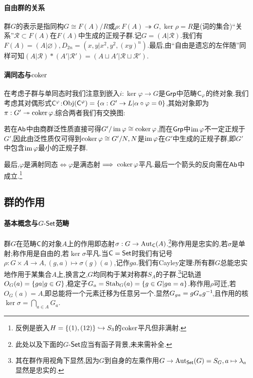 \documentclass[11pt]{article} %
\begin{document}
\paragraph{自由群的关系}
群$G$的表示是指同构$G\cong F(A)/R$或$\rho:F(A)\twoheadrightarrow G, \ker\rho=R$是(词的集合)``关系''$\mathcal{R}\subset F(A)$在$F(A)$中生成的正规子群.记$G=(A|\mathcal{R})$.我们有$F(A)=(A|\varnothing), D_{2n}=(x,y|x^2,y^2,(xy)^n)$.最后,由``自由是遗忘的左伴随''同样可知$(A|\mathcal{R})*(A'|\mathcal{R}')=(A\sqcup A'|\mathcal{R}\sqcup\mathcal{R}')$.

\begin{wrapfigure}[7]{r}{0.25\textwidth}
\end{wrapfigure}

\paragraph{满同态与$\operatorname{coker}$}
在考虑子群与单同态时我们注意到嵌入$i:\ker\varphi\to G$是$\mathsf{Grp}$中范畴$\mathsf{C}_\varphi$的终对象.我们考虑其对偶形式$\mathsf{C}^\varphi$:$\mathrm{Obj}(\mathsf{C}^\varphi)=\left\{\alpha:G'\to L|\alpha\circ\varphi=0\right\}$,其始对象即为$\pi:G'\twoheadrightarrow \operatorname{coker}\varphi$.综合两者我们有交换图:

若在$\mathsf{Ab}$中由商群泛性质直接可得$G'/\operatorname{im}\varphi\cong\operatorname{coker}\varphi$,而在$\mathsf{Grp}$中$\operatorname{im}\varphi$不一定正规于$G'$,因此由泛性质仅可得到$\operatorname{coker}\varphi\cong G'/N, N$是$\operatorname{im}\varphi$在$G'$中生成的正规子群,即$G'$中包含$\operatorname{im}\varphi$最小的正规子群.

最后,$\varphi$是满射同态$\iff \varphi$是满态射$\implies \operatorname{coker}\varphi$平凡.最后一个箭头的反向需在$\mathsf{Ab}$中成立.\footnote{反例是嵌入$H=\left\{(1),(12)\right\}\hookrightarrow S_3$的$\operatorname{coker}$平凡但非满射.}

\subsection{群的作用}
\paragraph{基本概念与$G\textrm{-}\mathsf{Set}$范畴}
群$G$在范畴$\mathsf{C}$的对象$A$上的作用即态射$\sigma:G\to \operatorname{Aut}_{\mathsf{C}}(A)$.\footnote{此处以及下面的$G$-$\mathsf{Set}$应当有函子背景,未来需补全.}称作用是忠实的,若$\sigma$是单射;称作用是自由的,若$\ker\sigma$平凡.当$\mathsf{C}=\mathsf{Set}$时我们有记号$\rho:G\times A\to A, (g,a)\mapsto \sigma(g)(a)$,记作$ga$.我们有Cayley定理:所有群$G$总能忠实地作用于某集合$A$上,换言之,$G$均同构于某对称群$S_A$的子群.\footnote{其在群作用视角下显然,因为$G$到自身的左乘作用$G\to \operatorname{Aut}_{\mathsf{Set}}(G)=S_G, a\mapsto \lambda_a$显然是忠实的.}记轨道$O_G(a)=\left\{ga|g\in G\right\}$,稳定子$G_a=\mathrm{Stab}_G(a)=\left\{g\in G|ga=a\right\}$.称作用$\rho$可迁,若$O_G(a)=A$,即总能将一个元素迁移为任意另一个.显然$G_{ga}=gG_a g^{-1}\!$,且作用的核$\ker\sigma=\bigcap_{a\in A}G_a$.
\end{document}
